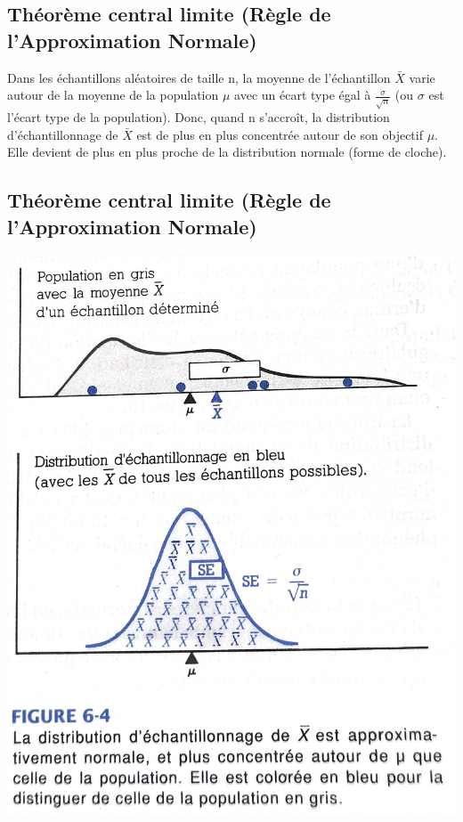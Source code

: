 \documentclass[
]{article}
\begin{document}
\hypertarget{thuxe9oruxe8me-central-limite-ruxe8gle-de-lapproximation-normale}{%
\subsection{Théorème central limite (Règle de l'Approximation
Normale)}\label{thuxe9oruxe8me-central-limite-ruxe8gle-de-lapproximation-normale}}

Dans les échantillons aléatoires de taille n, la moyenne de
l'échantillon \(\bar{X}\) varie autour de la moyenne de la population
\(\mu\) avec un écart type égal à \(\frac{\sigma}{\sqrt{n}}\) (ou
\(\sigma\) est l'écart type de la population). Donc, quand n s'accroît,
la distribution d'échantillonnage de \(\bar{X}\) est de plus en plus
concentrée autour de son objectif \(\mu\). Elle devient de plus en plus
proche de la distribution normale (forme de cloche).

\hypertarget{thuxe9oruxe8me-central-limite-ruxe8gle-de-lapproximation-normale-1}{%
\subsection{Théorème central limite (Règle de l'Approximation
Normale)}\label{thuxe9oruxe8me-central-limite-ruxe8gle-de-lapproximation-normale-1}}

\includegraphics{../Images/tcl.jpg}
\end{document}

